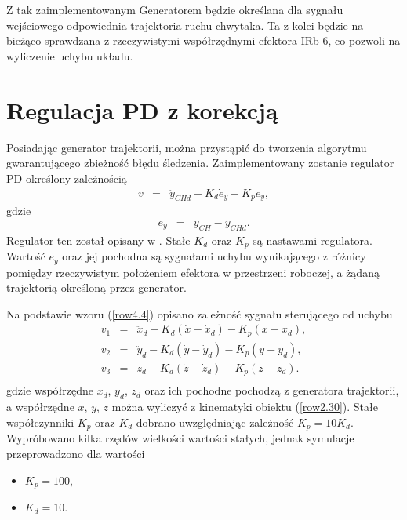 \documentclass[eng,printmode]{mgr}
\begin{document}
Z tak zaimplementowanym Generatorem będzie określana dla sygnału wejściowego odpowiednia trajektoria ruchu chwytaka. Ta z kolei będzie na bieżąco sprawdzana z rzeczywistymi współrzędnymi efektora IRb-6, co pozwoli na wyliczenie uchybu układu.
\section{Regulacja PD z korekcją}
 Posiadając generator trajektorii, można przystąpić do tworzenia algorytmu gwarantującego zbieżność błędu śledzenia. Zaimplementowany zostanie regulator PD określony zależnością
 \begin{eqnarray}
 \label{row4.4}
 v&=& \ddot{y}_{CHd}-K_d\dot{e}_y-K_pe_y,
 \end{eqnarray}
 gdzie
  \begin{eqnarray}\label{row4.5}
 e_y&=&y_{CH}-y_{CHd}.
 \end{eqnarray}
Regulator ten został opisany w \cite{b1}.  Stałe $K_d$ oraz $K_p$ są nastawami regulatora. Wartość $e_y$ oraz jej pochodna są sygnałami uchybu wynikającego z różnicy pomiędzy rzeczywistym położeniem efektora w przestrzeni roboczej, a żądaną trajektorią określoną przez generator. 

Na podstawie wzoru (\ref{row4.4}) opisano zależność sygnału sterującego od uchybu
\begin{eqnarray}
v_1 &=& \ddot{x}_{d}-K_d(\dot{x}-\dot{x}_d)-K_p(x-x_d), \\ \nonumber
v_2 &=& \ddot{y}_{d}-K_d(\dot{y}-\dot{y}_d)-K_p(y-y_d), \\ \nonumber
v_3 &=& \ddot{z}_{d}-K_d(\dot{z}-\dot{z}_d)-K_p(z-z_d). \\ \nonumber
\end{eqnarray}
gdzie współrzędne $x_d$, $y_d$, $z_d$ oraz ich pochodne pochodzą z generatora trajektorii, a współrzędne $x$, $y$, $z$ można wyliczyć z kinematyki obiektu (\ref{row2.30}). 
Stałe współczynniki $K_p$ oraz $K_d$ dobrano uwzględniając zależność $K_p=10K_d$. Wypróbowano kilka rzędów wielkości wartości stałych, jednak symulacje przeprowadzono dla wartości 
\begin{itemize}
\item $K_p=100$,
\item $K_d=10$.
\end{itemize}
\newpage
\end{document}
